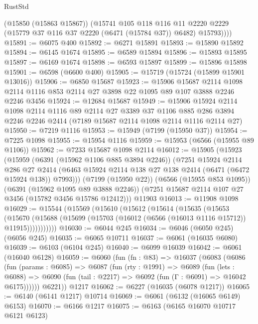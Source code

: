 \begin{lexlean}{RustStd}
\begin{coremodule}
          (@15850 (@15863 @15867))
          (@15741
            @105
            @118
            @116
            @11
            @2220
            @2229
            (@15779 @37 @116 @37 @2220 (@6471 (@15784 @37)) @6482)
            @15793))))
@15891 := @6075 @400
@15892 := @6271 @15891
@15893 := @15890 @15892
@15894 := @6145 @1674
@15895 := @6589 @15894
@15896 := @15893 @15895
@15897 := @6169 @1674
@15898 := @6593 @15897
@15899 := @15896 @15898
@15901 := @6598 (@6600 @400)
@15905 := @15719 (@15724 (@15899 @15901 @13016))
@15906 := @6850 @15687
@15923 := @15906
    @15687
    @2114
    @1098
    @2114
    @1116
    @853
    @2114
    @27
    @3898
    @22
    @1095
    @89
    @107
    @3888
    @2246
    @2246
    @3456
@15924 := @12684 @15687
@15949 := @15906
    @15924
    @2114
    @1098
    @2114
    @1116
    @89
    @2114
    @27
    @3389
    @37
    @1106
    @885
    @286
    @3894
    @2246
    @2246
    @2414
    (@7189 @15687 @2114 @1098 @2114 @1116 @2114 @27)
@15950 := @7219 @1116
@15953 := @15949 (@7199 (@15950 @37))
@15954 := @7225 @1098
@15955 := @15954 @1116
@15959 := @15953 (@6566 (@15955 @89 @1106))
@15962 := @7233 @15687 @1098 @2114
@16012 := @15905
    (@15923
      (@15959
        (@6391 (@15962 @1106 @885 @3894 @2246))
        (@7251
          @15924
          @2114
          @286
          @27
          @2414
          (@6463 @15924 @2114 @138 @27 @138 @2414 (@6471 (@6472 @15924 @138)) @7993)))
      (@7199 (@15950 @22))
      (@6566 (@15955 @853 @1095))
      (@6391 (@15962 @1095 @89 @3888 @2246))
      (@7251 @15687 @2114 @107 @27 @3456 (@15782 @3456 @15786 @12412)))
    @11903
@16013 := @11908 @1098
@16029 := @15544
    (@15569
      (@15610
        (@15612
          (@15614
            (@15635
              (@15653
                (@15670
                  (@15688 (@15699 (@15703 (@16012 (@6566 (@16013 @1116 @15712)) @11915)))))))))))
@16030 := @6044 @245
@16034 := @6046 (@6050 @245) (@6056 @245)
@16035 := @6065 @10711
@16037 := @6061 (@16035 @6080)
@16039 := @6103 (@6104 @245)
@16040 := @6099 @16039
@16042 := @6061 (@16040 @6128)
@16059 := @6060
    (fun (fn : @83) =>
    @16037
      (@6083
        (@6086
          (fun (params : @6085) =>
          @6087
            (fun (rty : @1991) =>
            @6089
              (fun (lets : @6088) =>
              @6090 (fun (tail : @2217) => @6092 (fun (Γ : @6091) => @16042 @6175))))))
        @6221))
    @1217
@16062 := @6227 (@16035 (@6078 @1217))
@16065 := @6140 (@6141 @1217) @10714
@16069 := @6061 (@6132 (@16065 @6149) @6153)
@16070 := @6166 @1217
@16075 := @6163 (@6165 @16070 @10717 @6121 @6123)

\end{coremodule}
\end{lexlean}
